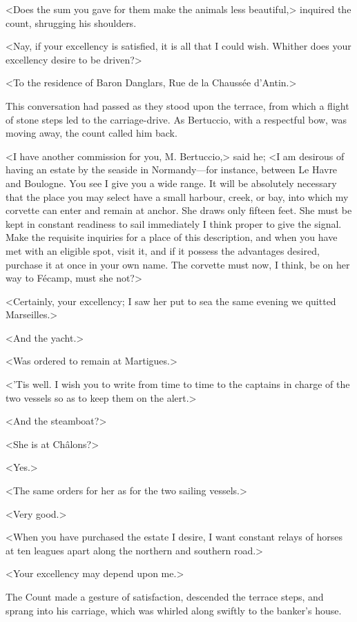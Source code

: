  <Does the sum you gave for them make the animals less beautiful,> inquired the count, shrugging his shoulders. 

 <Nay, if your excellency is satisfied, it is all that I could wish. Whither does your excellency desire to be driven?> 

 <To the residence of Baron Danglars, Rue de la Chaussée d'Antin.> 

 This conversation had passed as they stood upon the terrace, from which a flight of stone steps led to the carriage-drive. As Bertuccio, with a respectful bow, was moving away, the count called him back. 

 <I have another commission for you, M. Bertuccio,> said he; <I am desirous of having an estate by the seaside in Normandy—for instance, between Le Havre and Boulogne. You see I give you a wide range. It will be absolutely necessary that the place you may select have a small harbour, creek, or bay, into which my corvette can enter and remain at anchor. She draws only fifteen feet. She must be kept in constant readiness to sail immediately I think proper to give the signal. Make the requisite inquiries for a place of this description, and when you have met with an eligible spot, visit it, and if it possess the advantages desired, purchase it at once in your own name. The corvette must now, I think, be on her way to Fécamp, must she not?>

<Certainly, your excellency; I saw her put to sea the same evening we quitted Marseilles.> 

 <And the yacht.> 

 <Was ordered to remain at Martigues.> 

 <'Tis well. I wish you to write from time to time to the captains in charge of the two vessels so as to keep them on the alert.> 

 <And the steamboat?> 

 <She is at Châlons?> 

 <Yes.> 

 <The same orders for her as for the two sailing vessels.> 

 <Very good.> 

 <When you have purchased the estate I desire, I want constant relays of horses at ten leagues apart along the northern and southern road.> 

 <Your excellency may depend upon me.> 

 The Count made a gesture of satisfaction, descended the terrace steps, and sprang into his carriage, which was whirled along swiftly to the banker's house. 

